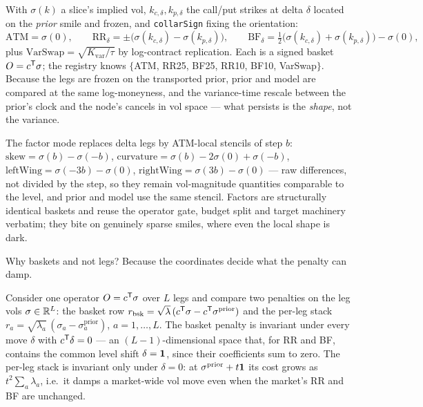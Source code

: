 \documentclass[11pt]{article}
\begin{document}
\begin{definition}
\label{def:operators}
With $\sigma(k)$ a slice's implied vol, $k_{c,\delta},k_{p,\delta}$
the call/put strikes at delta $\delta$ located on the \emph{prior}
smile and frozen, and \texttt{collarSign} fixing the orientation:
\[
\text{ATM}=\sigma(0),\qquad
\text{RR}_\delta=\pm\big(\sigma(k_{c,\delta})-\sigma(k_{p,\delta})\big),\qquad
\text{BF}_\delta=\tfrac12\big(\sigma(k_{c,\delta})
+\sigma(k_{p,\delta})\big)-\sigma(0),
\]
plus $\text{VarSwap}=\sqrt{K_{\mathrm{var}}/\tau}$ by log-contract
replication.  Each is a signed basket $O=c^{\mathsf{T}}\sigma$; the registry
knows $\{$ATM, RR25, BF25, RR10, BF10, VarSwap$\}$.  Because the legs
are frozen on the transported prior, prior and model are compared at
the same log-moneyness, and the variance-time rescale between the
prior's clock and the node's cancels in vol space --- what persists is
the \emph{shape}, not the variance.
\end{definition}

\begin{definition}
\label{def:factors}
The factor mode replaces delta legs by ATM-local stencils of step $b$:
$\text{skew}=\sigma(b)-\sigma(-b)$,
$\text{curvature}=\sigma(b)-2\sigma(0)+\sigma(-b)$,
$\text{leftWing}=\sigma(-3b)-\sigma(0)$,
$\text{rightWing}=\sigma(3b)-\sigma(0)$ --- raw differences, not
divided by the step, so they remain vol-magnitude quantities
comparable to the level, and prior and model use the same stencil.
Factors are structurally identical baskets and reuse the operator
gate, budget split and target machinery verbatim; they bite on
genuinely sparse smiles, where even the local shape is dark.
\end{definition}

Why baskets and not legs?  Because the coordinates decide what the
penalty can damp.

\begin{proposition}
\label{prop:nullspace}
Consider one operator $O=c^{\mathsf{T}}\sigma$ over $L$ legs and compare two
penalties on the leg vols $\sigma\in\mathbb{R}^L$: the basket row
$r_{\mathrm{bsk}}=\sqrt\lambda\,(c^{\mathsf{T}}\sigma-c^{\mathsf{T}}\sigma^{\mathrm{prior}})$
and the per-leg stack
$r_a=\sqrt{\lambda_a}\,(\sigma_a-\sigma_a^{\mathrm{prior}})$,
$a=1,\dots,L$.  The basket penalty is invariant under every move
$\delta$ with $c^{\mathsf{T}}\delta=0$ --- an $(L{-}1)$-dimensional space that,
for RR and BF, contains the common level shift $\delta=\mathbf{1}$, since
their coefficients sum to zero.  The per-leg stack is invariant only
under $\delta=0$: at $\sigma^{\mathrm{prior}}+t\mathbf{1}$ its cost grows as
$t^2\sum_a\lambda_a$, i.e.\ it damps a market-wide vol move even when
the market's RR and BF are unchanged.
\end{proposition}
\end{document}
